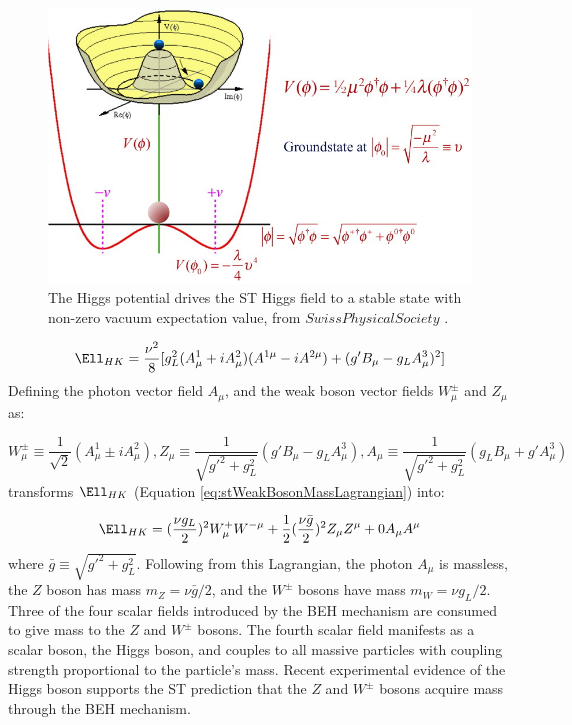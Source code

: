 \begin{figure}[h]
	\centering
	\includegraphics[width=1.0\textwidth]{figures/mexicanHatPotential.jpg}
	\caption{The Higgs potential drives the ST Higgs field to a stable state with non-zero vacuum expectation value, from $Swiss Physical Society$ \cite{higgsPotential}.}
	\label{fig:smHiggsPotential}
\end{figure}

\begin{equation}
	\Ell_{HK} = \frac{\nu^{2}}{8}[g^{2}_{L}(A^{1}_{\mu} + iA^{2}_{\mu})(A^{1\mu} - iA^{2\mu}) + (g'B_{\mu} - g_{L}A^{3}_{\mu})^{2}]
	\label{eq:stWeakBosonMassLagrangian}
\end{equation}
Defining the photon vector field $A_{\mu}$, and the weak boson vector fields $W^{\pm}_{\mu}$ and $Z_{\mu}$ as:

\begin{equation}
	W^{\pm}_{\mu} \equiv \frac{1}{\sqrt{2}}(A^{1}_{\mu} \pm iA^{2}_{\mu}), 
	Z_{\mu} \equiv \frac{1}{\sqrt{g'^{2} + g^{2}_{L}}}(g'B_{\mu} - g_{L}A^{3}_{\mu}), 
	A_{\mu} \equiv \frac{1}{\sqrt{g'^{2} + g^{2}_{L}}}(g_{L}B_{\mu} + g'A^{3}_{\mu})
\end{equation}
transforms $\Ell_{HK}$ (Equation \ref{eq:stWeakBosonMassLagrangian}) into:

\begin{equation}
	\Ell_{HK} = (\frac{\nu g_{L}}{2})^{2}W^{+}_{\mu}W^{-\mu} + \frac{1}{2}(\frac{\nu \bar{g}}{2})^{2}Z_{\mu}Z^{\mu} + 0A_{\mu}A^{\mu}
\end{equation}
where $\bar{g} \equiv \sqrt{g'^{2} + g^{2}_{L}}$.  Following from this Lagrangian, the photon $A_{\mu}$ is massless, 
the $Z$ boson has mass $m_{Z} = \nu\bar{g}/2$, and the $W^{\pm}$ bosons have mass $m_{W} = \nu g_{L}/2$.  
Three of the four scalar fields introduced by the BEH mechanism are consumed to give mass to the $Z$ 
and $W^{\pm}$ bosons.  The fourth scalar field manifests as a scalar boson, the Higgs boson, and couples to all 
massive particles with coupling strength proportional to the particle's mass.  Recent experimental evidence 
of the Higgs boson \cite{combinedHiggsResult} supports the ST prediction that the $Z$ and $W^{\pm}$ bosons acquire 
mass through the BEH mechanism.

